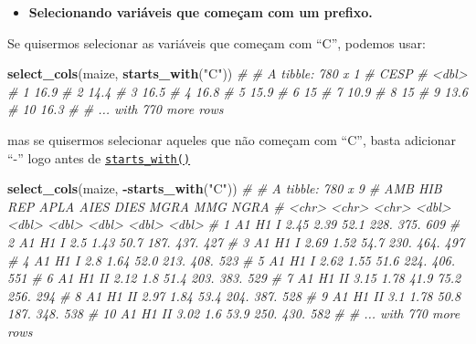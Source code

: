 \documentclass[
]{book}
\newenvironment{Shaded}{\begin{snugshade}}{\end{snugshade}}
\newcommand{\CommentTok}[1]{\textcolor[rgb]{0.56,0.35,0.01}{\textit{#1}}}
\newcommand{\KeywordTok}[1]{\textcolor[rgb]{0.13,0.29,0.53}{\textbf{#1}}}
\newcommand{\NormalTok}[1]{#1}
\newcommand{\OperatorTok}[1]{\textcolor[rgb]{0.81,0.36,0.00}{\textbf{#1}}}
\newcommand{\StringTok}[1]{\textcolor[rgb]{0.31,0.60,0.02}{#1}}
\providecommand{\tightlist}{%
  \setlength{\itemsep}{0pt}\setlength{\parskip}{0pt}}
\begin{document}
\begin{itemize}
\tightlist
\item
  \textbf{Selecionando variáveis que começam com um prefixo.}
\end{itemize}

Se quisermos selecionar as variáveis que começam com ``C'', podemos usar:

\begin{Shaded}
\begin{Highlighting}[]
\KeywordTok{select_cols}\NormalTok{(maize, }\KeywordTok{starts_with}\NormalTok{(}\StringTok{"C"}\NormalTok{))}
\CommentTok{# # A tibble: 780 x 1}
\CommentTok{#     CESP}
\CommentTok{#    <dbl>}
\CommentTok{#  1  16.9}
\CommentTok{#  2  14.4}
\CommentTok{#  3  16.5}
\CommentTok{#  4  16.8}
\CommentTok{#  5  15.9}
\CommentTok{#  6  15  }
\CommentTok{#  7  10.9}
\CommentTok{#  8  15  }
\CommentTok{#  9  13.6}
\CommentTok{# 10  16.3}
\CommentTok{# # ... with 770 more rows}
\end{Highlighting}
\end{Shaded}

mas se quisermos selecionar aqueles que não começam com ``C'', basta adicionar ``-'' logo antes de \href{https://tidyselect.r-lib.org/reference/select_helpers.html}{\texttt{starts\_with()}}

\begin{Shaded}
\begin{Highlighting}[]
\KeywordTok{select_cols}\NormalTok{(maize, }\OperatorTok{-}\KeywordTok{starts_with}\NormalTok{(}\StringTok{"C"}\NormalTok{))}
\CommentTok{# # A tibble: 780 x 9}
\CommentTok{#    AMB   HIB   REP    APLA  AIES  DIES  MGRA   MMG  NGRA}
\CommentTok{#    <chr> <chr> <chr> <dbl> <dbl> <dbl> <dbl> <dbl> <dbl>}
\CommentTok{#  1 A1    H1    I      2.45  2.39  52.1 228.   375.   609}
\CommentTok{#  2 A1    H1    I      2.5   1.43  50.7 187.   437.   427}
\CommentTok{#  3 A1    H1    I      2.69  1.52  54.7 230.   464.   497}
\CommentTok{#  4 A1    H1    I      2.8   1.64  52.0 213.   408.   523}
\CommentTok{#  5 A1    H1    I      2.62  1.55  51.6 224.   406.   551}
\CommentTok{#  6 A1    H1    II     2.12  1.8   51.4 203.   383.   529}
\CommentTok{#  7 A1    H1    II     3.15  1.78  41.9  75.2  256.   294}
\CommentTok{#  8 A1    H1    II     2.97  1.84  53.4 204.   387.   528}
\CommentTok{#  9 A1    H1    II     3.1   1.78  50.8 187.   348.   538}
\CommentTok{# 10 A1    H1    II     3.02  1.6   53.9 250.   430.   582}
\CommentTok{# # ... with 770 more rows}
\end{Highlighting}
\end{Shaded}
\end{document}
